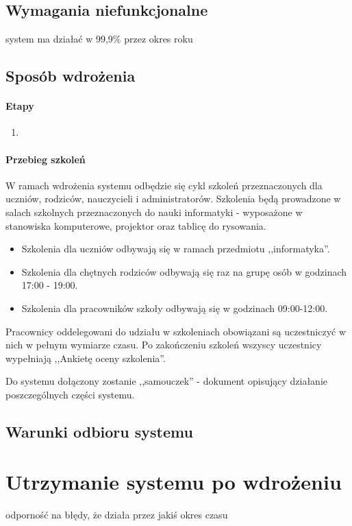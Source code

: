 \documentclass{article}
\begin{document}
\subsection{Wymagania niefunkcjonalne}
system ma działać w 99,9\% przez okres roku

\subsection{Sposób wdrożenia}
\paragraph{Etapy}
\begin{enumerate}
\item 
\end{enumerate}
\paragraph{Przebieg szkoleń}
W ramach wdrożenia systemu odbędzie się cykl szkoleń przeznaczonych dla uczniów, rodziców, nauczycieli i administratorów. Szkolenia będą prowadzone w salach szkolnych przeznaczonych do nauki informatyki - wyposażone w stanowiska komputerowe, projektor oraz tablicę do rysowania.
\begin{itemize}
\item Szkolenia dla uczniów odbywają się w ramach przedmiotu ,,informatyka''.
\item Szkolenia dla chętnych rodziców odbywają się raz na grupę osób w godzinach 17:00 - 19:00.
\item Szkolenia dla pracowników szkoły odbywają się w godzinach 09:00-12:00.
\end{itemize}
Pracownicy oddelegowani do udziału w szkoleniach obowiązani są uczestniczyć w nich w pełnym wymiarze czasu. Po zakończeniu szkoleń wszyscy uczestnicy wypełniają ,,Ankietę oceny szkolenia''.

Do systemu dołączony zostanie ,,samouczek'' - dokument opisujący działanie poszczególnych części systemu.

\subsection{Warunki odbioru systemu}
\section{Utrzymanie systemu po wdrożeniu}
odporność na błędy, że działa przez jakiś okres czasu
\end{document}
